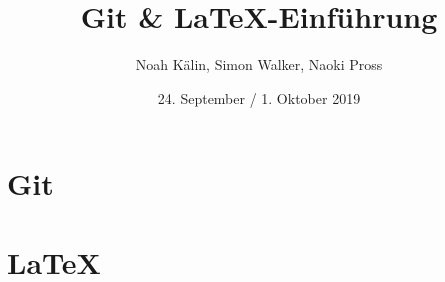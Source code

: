 \documentclass{beamer}
\title{Git \& \textrm{\LaTeX}-Einführung}
\author{
    Noah Kälin\inst{1},
    Simon Walker\inst{1},
	Naoki Pross\inst{1}
}
\institute[HSR]{\inst{1}Hochschule f\"ur Technick Rapperswil}
\date{24. September / 1. Oktober 2019}
\begin{document}
\frame{\titlepage}

\part{Git}

\part{\textrm{\LaTeX}}

\end{document}

